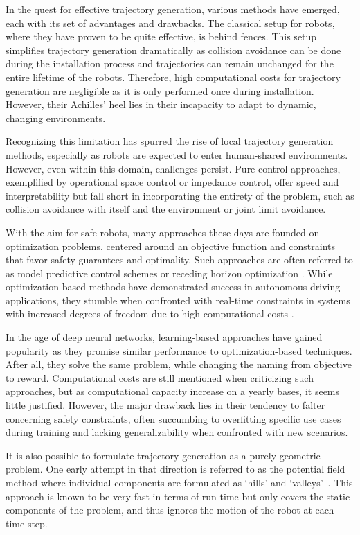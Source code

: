 In the quest for effective trajectory generation, various
methods have emerged, each with its set of advantages and
drawbacks. The classical setup for robots, where they have
proven to be quite effective, is behind fences. This setup
simplifies trajectory generation dramatically as collision
avoidance can be done during the installation process and
trajectories can remain unchanged for the entire lifetime of
the robots. Therefore, high computational costs for
trajectory generation are negligible as it is only performed
once during installation. However, their Achilles' heel lies
in their incapacity to adapt to dynamic, changing
environments.

Recognizing this limitation has spurred the rise of local
trajectory generation methods, especially as robots are
expected to enter human-shared environments. However, even
within this domain, challenges persist. Pure control
approaches, exemplified by operational space control or
impedance control, offer speed and interpretability but fall
short in incorporating the entirety of the problem, such as
collision avoidance with itself and the environment or
joint limit avoidance.

With the aim for safe robots, many approaches these days are
founded on optimization problems, centered around an
objective function and constraints that favor safety
guarantees and optimality. Such approaches are often
referred to as model predictive control schemes or receding
horizon optimization \cite{hewing2020learning}. While
optimization-based methods have demonstrated success in
autonomous driving applications, they stumble when
confronted with real-time constraints in systems with
increased degrees of freedom due to high computational costs
\cite{spahn2021coupled}.

In the age of deep neural networks, learning-based
approaches have gained popularity as they promise similar
performance to optimization-based techniques. After all,
they solve the same problem, while changing the naming from
objective to reward. Computational costs
are still mentioned when criticizing such approaches, but as
computational capacity increase on a yearly bases, it seems
little justified. However, the major drawback lies in their
tendency to falter concerning safety constraints, often
succumbing to overfitting specific use cases during training
and lacking generalizability when confronted with new
scenarios.


It is also possible to formulate trajectory generation as a
purely geometric problem. One early attempt in that
direction is referred to as the potential field method where
individual components are formulated as `hills' and
`valleys'~\cite{barraquand1992numerical,hwang1992potential}.
This approach is known to be very fast in terms of run-time
but only covers the static components of the problem, and
thus ignores the motion of the robot at each time step.

